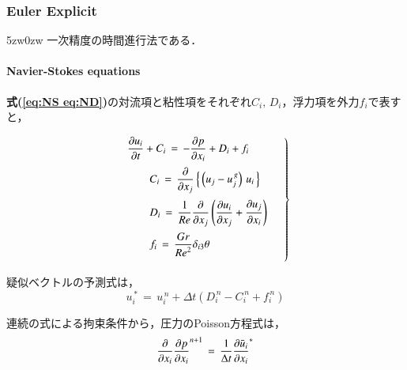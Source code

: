 \subsubsection{Euler Explicit}
\begin{indentation}{5zw}{0zw}
一次精度の時間進行法である．

\paragraph{Navier-Stokes equations} $\mbox{}$\\
\textbf{式(\ref{eq:NS eq:ND})}の対流項と粘性項をそれぞれ$C_i,\,D_i$，浮力項を外力$f_i$で表すと，

\begin{equation}
\left.
\begin{array}{l}
\vspace{2mm}
\displaystyle{ \frac{\partial u_i}{\partial t} + C_i \,=\, - \frac{\partial p}{\partial x_i} + D_i + f_i } \\
\vspace{2mm}
\qquad \displaystyle{ C_i \,=\, \frac{\partial}{\partial x_j} \left\{ \, \left( u_j - u_j^{\,g} \right) \, u_i \, \right\} } \\
\vspace{2mm}
\qquad \displaystyle{ D_i \,=\, \frac{1}{Re}\frac{\partial}{\partial x_j} \left( \frac{\partial u_i}{\partial x_j} + \frac{\partial u_j}{\partial x_i} \right) } \\
\vspace{2mm}
\qquad \displaystyle{ f_i \,=\, \frac{Gr}{{Re}^2} \delta_{i3} \theta } \\
\end{array} \quad \right \}
\label{eq:NS eq CDf}
\end{equation}

\noindent 疑似ベクトルの予測式は，
\begin{equation}
u_i^{\,*} \,=\, u_i^{\,n} + \Delta t \left( D_i^{\,n} - C_i^{\,n} + f_i^{\,n} \right)
\label{eq:pseudo vector EE}
\end{equation}

\noindent 連続の式による拘束条件から，圧力のPoisson方程式は，
\begin{equation}
\frac{\partial}{\partial x_i} {\frac{\partial p}{\partial x_i}}^{n+1}
\,=\,
\frac{1}{\Delta t} {\frac{\partial \bar{u}_i}{\partial x_i}}^* \vspace{1mm}
\label{eq:Poisson eq}
\end{equation}


\end{indentation}
